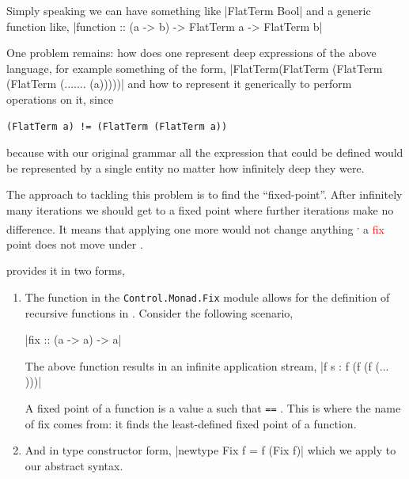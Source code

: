 \documentclass[thesis-solanki.tex]{subfiles}
\begin{document}
Simply speaking we can have something like
|FlatTerm Bool|
and a generic function like,
|function :: (a -> b) -> FlatTerm a -> FlatTerm b|

One problem remains: how does one represent deep expressions
of the above language, 
for example something of the form,
|FlatTerm(FlatTerm (FlatTerm (FlatTerm (....... (a)))))|
and how to represent it generically to perform operations on it, since
\begin{verbatim}
(FlatTerm a) != (FlatTerm (FlatTerm a))
\end{verbatim}
%
because with our original grammar all the expression that could be defined would be represented by a single entity
 no matter how infinitely deep they were.

The approach to tackling this problem is to find the ``fixed-point''.
After infinitely many iterations we should get to a fixed point where further iterations make no
difference.
It means that applying one more  would not change anything \textsuperscript{,}
a \textcolor{red}{fix}
point does not move under .

 provides it in two forms,
\begin{enumerate}

\item The  function in the \texttt{Control.Monad.Fix} module allows for the definition of recursive functions in . Consider the following scenario,

|fix :: (a -> a) -> a|

The above function results in an infinite application stream,
|f s : f (f (f (... )))|

A fixed point of a function  is a value a such that  \Verb!==! .
This is where the name of fix comes from: it finds the least-defined fixed
point of a function.

\item And in type constructor form,
|newtype Fix f = f (Fix f)|
which we apply to our abstract syntax.

\end{enumerate}
\end{document}

